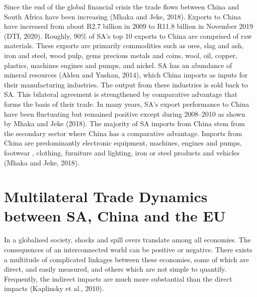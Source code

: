 \documentclass[11pt,preprint, authoryear]{elsarticle}
\numberwithin{equation}{section}
\numberwithin{figure}{section}
\numberwithin{table}{section}
\begin{document}
Since the end of the global financial crisis the trade flows between
China and South Africa have been increasing (Mhaka and Jeke, 2018).
Exports to China have increased from about R2.7 billion in 2009 to R11.8
billion in November 2019 (DTI, 2020). Roughly, 90\% of SA's top 10
exports to China are comprised of raw materials. These exports are
primarily commodities such as ores, slag and ash, iron and steel, wood
pulp, gems precious metals and coins, wool, oil, copper, plastics,
machines engines and pumps, and nickel. SA has an abundance of mineral
resources (Alden and Yushan, 2014), which China imports as inputs for
their manufacturing industries. The output from these industries is sold
back to SA. This bilateral agreement is strengthened by comparative
advantage that forms the basis of their trade. In many years, SA's
export performance to China have been fluctuating but remained positive
except during 2008--2010 as shown by Mhaka and Jeke (2018). The majority
of SA imports from China stem from the secondary sector where China has
a comparative advantage. Imports from China are predominantly electronic
equipment, machines, engines and pumps, footwear , clothing, furniture
and lighting, iron or steel products and vehicles (Mhaka and Jeke,
2018).

\hypertarget{multilateral-trade-dynamics-between-sa-china-and-the-eu}{%
\section{Multilateral Trade Dynamics between SA, China and the
EU}\label{multilateral-trade-dynamics-between-sa-china-and-the-eu}}

In a globalised society, shocks and spill overs translate among all
economies. The consequences of an interconnected world can be positive
or negative. There exists a multitude of complicated linkages between
these economies, some of which are direct, and easily measured, and
others which are not simple to quantify. Frequently, the indirect
impacts are much more substantial than the direct impacts (Kaplinsky et
al., 2010).
\end{document}
